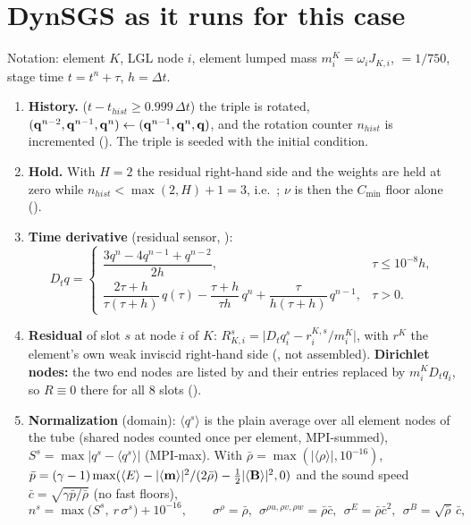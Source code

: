 \documentclass[10pt]{article}
\begin{document}
\section{DynSGS as it runs for this case}
\label{sec:dsgs}
Notation: element $K$, LGL node $i$, element lumped mass $m^K_i=\omega_i J_{K,i}$,
 $=1/750$, stage time $t=t^n+\tau$, $h=\Delta t$.

\begin{enumerate}[leftmargin=*]
\item \textbf{History.}  ($t-t_{hist}\ge0.999\,\Delta t$) the
\dsgs{} triple is rotated, $(\mathbf{q}^{n-2},\mathbf{q}^{n-1},\mathbf{q}^n)\leftarrow(\mathbf{q}^{n-1},\mathbf{q}^n,\mathbf{q})$, and the
rotation counter $n_{hist}$ is incremented (). The triple is seeded with the
initial condition.
\item \textbf{Hold.} With $H=2$ the residual right-hand side and the weights are held at zero
while $n_{hist}<\max(2,H)+1=3$, i.e.\ ; $\nu$ is then the
$C_{\min}$ floor alone ().
\item \textbf{Time derivative} (residual sensor, ):
\[
D_t q=\begin{cases}
\dfrac{3q^n-4q^{n-1}+q^{n-2}}{2h}, & \tau\le10^{-8}h,\\[8pt]
\dfrac{2\tau+h}{\tau(\tau+h)}\,q(\tau)-\dfrac{\tau+h}{\tau h}\,q^n+\dfrac{\tau}{h(\tau+h)}\,q^{n-1}, & \tau>0 .
\end{cases}
\]
\item \textbf{Residual} of slot $s$ at node $i$ of $K$: $R^s_{K,i}=\big|D_tq^s_i - r^{K,s}_i/m^K_i\big|$,
with $r^K$ the element's own weak inviscid right-hand side (, not assembled).
\textbf{Dirichlet nodes:} the two end nodes are listed by  and their
entries replaced by $m^K_i D_tq_i$, so $R\equiv0$ there for all 8 slots ().
\item \textbf{Normalization} (domain): $\langle q^s\rangle$ is the plain average over all element
nodes of the tube (shared nodes counted once per element, MPI-summed), $S^s=\max|q^s-\langle q^s\rangle|$
(MPI-max). With $\bar\rho=\max(|\langle\rho\rangle|,10^{-16})$, $\bar p=(\gamma-1)\max(\langle E\rangle-|\langle\mathbf{m}\rangle|^2/(2\bar\rho)-\tfrac12|\langle\mathbf{B}\rangle|^2,0)$
and the sound speed $\bar c=\sqrt{\gamma\bar p/\bar\rho}$ (no fast floors),
\[
n^s=\max\big(S^s,\ r\,\sigma^s\big)+10^{-16},\qquad
\sigma^\rho=\bar\rho,\ \ \sigma^{\rho u,\rho v,\rho w}=\bar\rho\bar c,\ \ \sigma^E=\bar\rho\bar c^2,\ \ \sigma^{B}=\sqrt{\bar\rho}\,\bar c,
\]
\end{enumerate}
\end{document}
